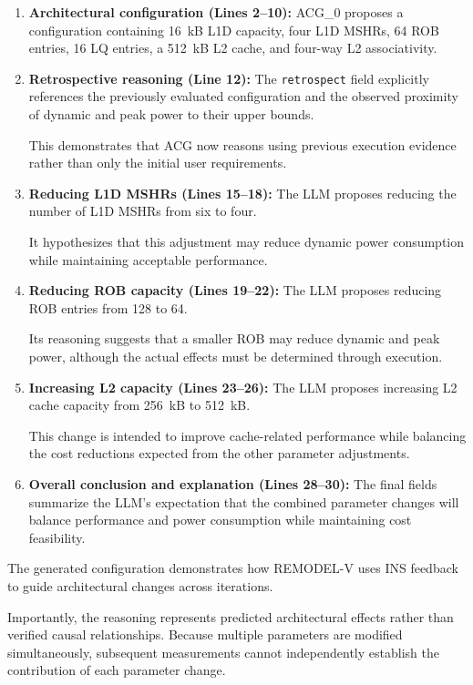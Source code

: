 \begin{enumerate}

\item \textbf{Architectural configuration
(Lines 2--10):}
ACG\_0 proposes a configuration containing
16~kB L1D capacity, four L1D MSHRs,
64 ROB entries, 16 LQ entries, a
512~kB L2 cache, and four-way
L2 associativity.

\item \textbf{Retrospective reasoning
(Line 12):}
The \texttt{retrospect} field explicitly
references the previously evaluated
configuration and the observed proximity
of dynamic and peak power to their
upper bounds.

This demonstrates that ACG now reasons
using previous execution evidence rather
than only the initial user requirements.

\item \textbf{Reducing L1D MSHRs
(Lines 15--18):}
The LLM proposes reducing the number
of L1D MSHRs from six to four.

It hypothesizes that this adjustment
may reduce dynamic power consumption
while maintaining acceptable performance.

\item \textbf{Reducing ROB capacity
(Lines 19--22):}
The LLM proposes reducing ROB entries
from 128 to 64.

Its reasoning suggests that a smaller
ROB may reduce dynamic and peak power,
although the actual effects must be
determined through execution.

\item \textbf{Increasing L2 capacity
(Lines 23--26):}
The LLM proposes increasing L2 cache
capacity from 256~kB to 512~kB.

This change is intended to improve
cache-related performance while
balancing the cost reductions expected
from the other parameter adjustments.

\item \textbf{Overall conclusion and
explanation (Lines 28--30):}
The final fields summarize the LLM's
expectation that the combined parameter
changes will balance performance and
power consumption while maintaining
cost feasibility.

\end{enumerate}

The generated configuration demonstrates
how REMODEL-V uses INS feedback to guide
architectural changes across iterations.

Importantly, the reasoning represents
predicted architectural effects rather
than verified causal relationships.
Because multiple parameters are modified
simultaneously, subsequent measurements
cannot independently establish the
contribution of each parameter change.

